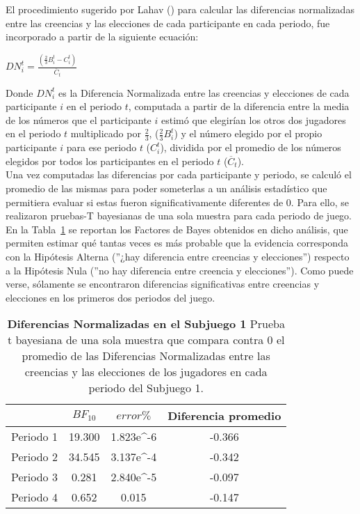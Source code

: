 El procedimiento sugerido por Lahav (\citeyear{Lahav}) para calcular las diferencias normalizadas entre las creencias y las elecciones de cada participante en cada periodo, fue incorporado a partir de la siguiente ecuación:\\

\begin{center}
$DN_i^t =  \frac{(\frac{2}{3}B_i^t - C_i^t)}{\overline{C}_t} $
\end{center}

Donde $DN_i^t$ es la Diferencia Normalizada entre las creencias y elecciones de cada participante $i$ en el periodo $t$, computada a partir de la diferencia entre  la media de los números que el participante $i$ estimó que elegirían los otros dos jugadores en el periodo $t$ multiplicado por $\frac{2}{3}$, ($\frac{2}{3}B_i^t$) y el número elegido por el propio participante $i$ para ese periodo $t$ ($C_i^t$), dividida por el promedio de los números elegidos por todos los participantes en el periodo $t$ ($\overline{C}_t$).\\

Una vez computadas las diferencias por cada participante y periodo, se calculó el promedio de las mismas para poder someterlas a un análisis estadístico que permitiera evaluar si estas fueron significativamente diferentes de 0. Para ello, se realizaron pruebas-T bayesianas de una sola muestra para cada periodo de juego. En la Tabla~\ref{DN-S1-B} se reportan los Factores de Bayes obtenidos en dicho análisis, que permiten estimar qué tantas veces es más probable que la evidencia corresponda con la Hipótesis Alterna (''¿hay diferencia entre creencias y elecciones'') respecto a la Hipótesis Nula (''no hay diferencia entre creencia y elecciones''). Como puede verse, sólamente se encontraron diferencias significativas entre creencias y elecciones en los primeros dos periodos del juego.\\

\begin{table}[h]
\caption[Diferencias Normalizadas en el Subjuego 1 (prueba t de una muestra)]{\textbf{Diferencias Normalizadas en el Subjuego 1} Prueba t bayesiana de una sola muestra que compara contra 0 el promedio de las Diferencias Normalizadas entre las creencias y las elecciones de los jugadores en cada periodo del Subjuego 1.}
\label{DN-S1-B}
\centering
\begin{tabular}{l | c c | c}
\toprule
\textbf{} & \textbf{$BF_{10}$} & \textbf{$error\%$} & \textbf{Diferencia promedio}\\
\midrule
Periodo 1 & 19.300 & 1.823e^-6 & -0.366\\
Periodo 2 & 34.545 & 3.137e^-4 & -0.342\\
Periodo 3 & 0.281 & 2.840e^-5 & -0.097\\
Periodo 4 & 0.652 & 0.015 & -0.147\\
\bottomrule
\end{tabular}
\end{table}

